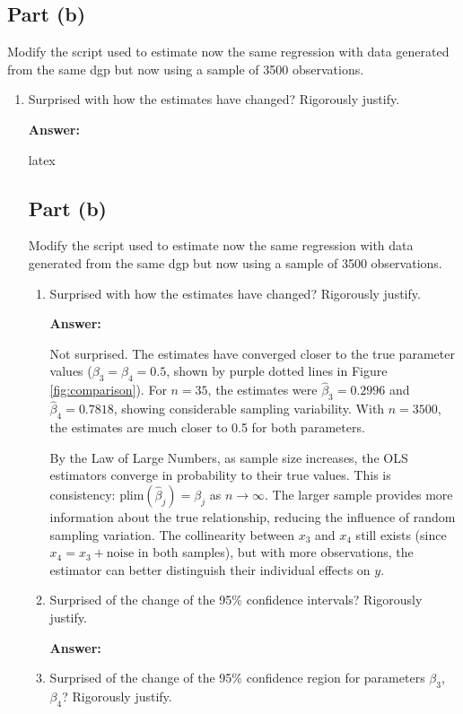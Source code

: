 \documentclass[12pt,a4paper]{article}
\begin{document}
\subsection*{Part (b)}
Modify the script used to estimate now the same regression with data generated from the same dgp but now using a sample of 3500 observations.

\begin{enumerate}[label=(\roman*)]
  \item Surprised with how the estimates have changed? Rigorously justify.

  \textbf{Answer:} 

latex\subsection*{Part (b)}
Modify the script used to estimate now the same regression with data 
generated from the same dgp but now using a sample of 3500 observations.

\begin{enumerate}[label=(\roman*)]
  \item Surprised with how the estimates have changed? Rigorously justify.
  
  \textbf{Answer:} 
  
  Not surprised. The estimates have converged closer to the true parameter 
  values ($\beta_3=\beta_4=0.5$, shown by purple dotted lines in Figure 
  \ref{fig:comparison}). For $n=35$, the estimates were $\hat{\beta}_3=0.2996$ 
  and $\hat{\beta}_4=0.7818$, showing considerable sampling variability. 
  With $n=3500$, the estimates are much closer to 0.5 for both parameters.
  
  By the Law of Large Numbers, as sample size increases, the OLS estimators 
  converge in probability to their true values. This is consistency: 
  $\text{plim}(\hat{\beta}_j) = \beta_j$ as $n \to \infty$. The larger 
  sample provides more information about the true relationship, reducing 
  the influence of random sampling variation. The collinearity between $x_3$ 
  and $x_4$ still exists (since $x_4 = x_3 + \text{noise}$ in both samples), 
  but with more observations, the estimator can better distinguish their 
  individual effects on $y$.
  
  
  \item Surprised of the change of the 95\% confidence intervals? Rigorously justify.
  
  \textbf{Answer:} 
  
  \item Surprised of the change of the 95\% confidence region for parameters $\beta_3$, $\beta_4$? Rigorously justify.
  

\end{enumerate}
\end{enumerate}
\end{document}
